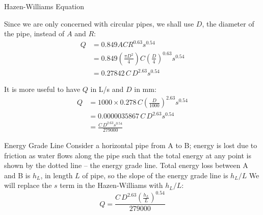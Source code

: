 \documentclass[9pt,xcolor={svgnames, x11names},mathpazo, professionalfonts]{beamer}
\begin{document}

\begin{frame}{Hazen-Williams Equation}
	
	Since we are only concerned with circular pipes, we shall use $D$, the diameter of the pipe, instead of $A$ and $R$:
	\begin{align*}
		Q & = 0.849ACR^{0.63}s^{0.54}                                                     \\
		  & = 0.849\left(\frac{\pi D^2}{4}\right)C\left(\frac{D}{4}\right)^{0.63}s^{0.54} \\
		  & = 0.27842\,C\,D^{2.63}s^{0.54}                                                
	\end{align*}
	\pause
	\parm
	
	It is more useful to have $Q$ in L/s and $D$ in mm:
	\begin{align*}
		Q & = 1000\times 0.278\,C\left(\frac{D}{1000}\right)^{2.63}s^{0.54} \\
		  & = 0.0000035867\,C\,D^{2.63}s^{0.54}                             \\
		  & = \frac{C\,D^{2.63}s^{0.54}}{279000}                            
	\end{align*}
	
\end{frame}



\begin{frame}{Energy Grade Line}
	Consider a horizontal pipe from A to B; energy is lost due to friction as water flows along the pipe such that the total energy at any point is shown by the dotted line -- the energy grade line.
	\parm
	Total energy loss between A and B is $h_L$, in length $L$ of pipe, so the slope of the energy grade line is $h_L/L$
	\parm
	We will replace the $s$ term in the Hazen-Williams with $h_L/L$:
	\[ Q = \frac{C\,D^{2.63}\left(\frac{h_L}{L}\right)^{0.54}}{279000} \]
	
	
	
	
\end{frame}

\end{document}

